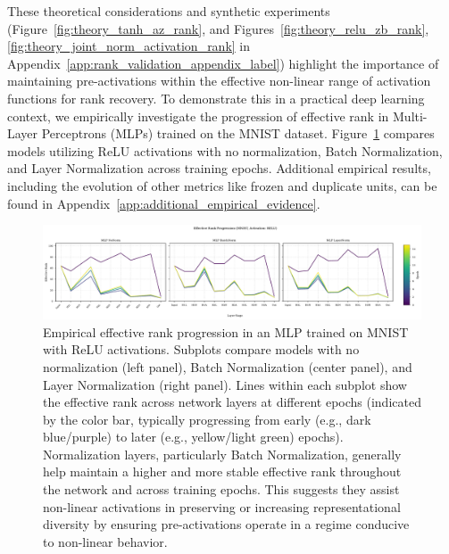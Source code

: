 \documentclass{article}
\begin{document}

These theoretical considerations and synthetic experiments (Figure~\ref{fig:theory_tanh_az_rank}, and Figures~\ref{fig:theory_relu_zb_rank}, \ref{fig:theory_joint_norm_activation_rank} in Appendix~\ref{app:rank_validation_appendix_label}) highlight the importance of maintaining pre-activations within the effective non-linear range of activation functions for rank recovery. 
To demonstrate this in a practical deep learning context, we empirically investigate the progression of effective rank in Multi-Layer Perceptrons (MLPs) trained on the MNIST dataset. Figure~\ref{fig:empirical_rank_progression} compares models utilizing ReLU activations with no normalization, Batch Normalization, and Layer Normalization across training epochs. Additional empirical results, including the evolution of other metrics like frozen and duplicate units, can be found in Appendix~\ref{app:additional_empirical_evidence}.

\begin{figure}[ht!]
    \centering
    \includegraphics[width=\textwidth]{figures/empirical_rank_progression_relu_mnist.pdf} 
    \caption{Empirical effective rank progression in an MLP trained on MNIST with ReLU activations. Subplots compare models with no normalization (left panel), Batch Normalization (center panel), and Layer Normalization (right panel). Lines within each subplot show the effective rank across network layers at different epochs (indicated by the color bar, typically progressing from early (e.g., dark blue/purple) to later (e.g., yellow/light green) epochs). Normalization layers, particularly Batch Normalization, generally help maintain a higher and more stable effective rank throughout the network and across training epochs. This suggests they assist non-linear activations in preserving or increasing representational diversity by ensuring pre-activations operate in a regime conducive to non-linear behavior.}
    \label{fig:empirical_rank_progression}
\end{figure}
\end{document}
